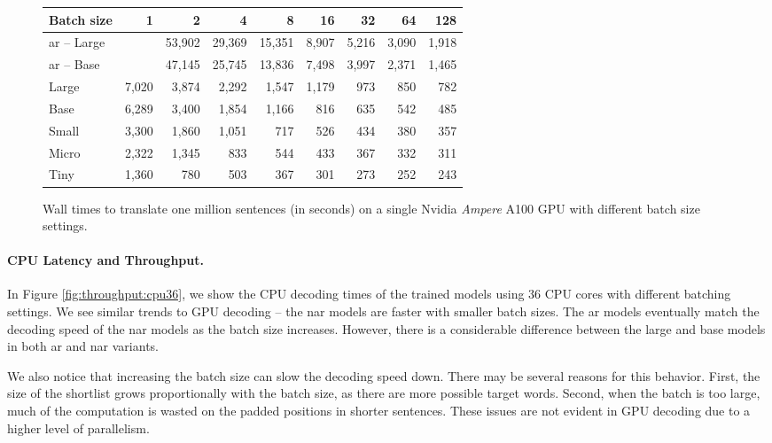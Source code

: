 \begin{figure}
  \centering
  
  \vspace{1\baselineskip}

  \begin{tabular}{lrrrrrrrr}
    \toprule
    Batch size & 1 & 2 & 4 & 8 & 16 & 32 & 64 & 128 \\
    \midrule
    \acs{ar} -- Large && 53,902 & 29,369 & 15,351 & 8,907 & 5,216 & 3,090 & 1,918 \\
    \acs{ar} -- Base  && 47,145 & 25,745 & 13,836 & 7,498 & 3,997 & 2,371 & 1,465 \\
    \midrule
    Large & 7,020 & 3,874 & 2,292 & 1,547 & 1,179 & 973 & 850 & 782 \\
    Base  & 6,289 & 3,400 & 1,854 & 1,166 &   816 & 635 & 542 & 485 \\
    Small & 3,300 & 1,860 & 1,051 &   717 &   526 & 434 & 380 & 357 \\
    Micro & 2,322 & 1,345 &   833 &   544 &   433 & 367 & 332 & 311 \\
    Tiny  & 1,360 &   780 &   503 &   367 &   301 & 273 & 252 & 243 \\
    \bottomrule
  \end{tabular}

  \caption{Wall times to translate one million sentences (in seconds) on a
    single Nvidia \emph{Ampere} A100 GPU with different batch size settings.}%
  \label{fig:throughput:a100}
\end{figure}


\paragraph{CPU Latency and Throughput.}
In Figure \ref{fig:throughput:cpu36}, we show the CPU decoding times of the
trained models using 36 CPU cores with different batching settings.  We see
similar trends to GPU decoding -- the \ac{nar} models are faster with smaller
batch sizes. The \ac{ar} models eventually match the decoding speed of the
\ac{nar} models as the batch size increases. However, there is a considerable
difference between the large and base models in both \ac{ar} and \ac{nar}
variants.

We also notice that increasing the batch size can slow the decoding speed
down. There may be several reasons for this behavior. First, the size of the
shortlist grows proportionally with the batch size, as there are more possible
target words. Second, when the batch is too large, much of the computation is
wasted on the padded positions in shorter sentences. These issues are not
evident in GPU decoding due to a higher level of parallelism.

